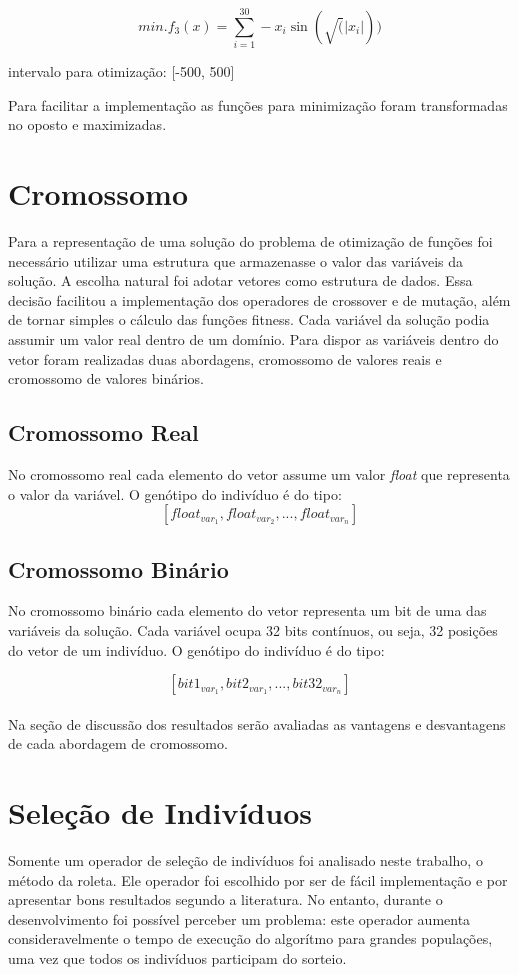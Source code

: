 \documentclass[conference]{IEEEtran}
\begin{document}
\[min. f_3(x) = \sum_{i=1}^{30} -x_i \sin(\sqrt(\left|x_i\right|))\]
\begin{center}intervalo para otimização: [-500, 500]\\\end{center}

Para facilitar a implementação as funções para minimização foram transformadas 
no oposto e maximizadas.

\section{Cromossomo}
Para a representação de uma solução do problema de otimização de funções foi
necessário utilizar uma estrutura que armazenasse o valor das variáveis da
solução. A escolha natural foi adotar vetores como estrutura de dados. Essa
decisão facilitou a implementação dos operadores de crossover e de mutação, além
de tornar simples o cálculo das funções fitness.
Cada variável da solução podia assumir um valor real dentro de um domínio. Para
dispor as variáveis dentro do vetor foram realizadas duas abordagens, cromossomo
de valores reais e cromossomo de valores binários.\\

\subsection{Cromossomo Real}
No cromossomo real cada elemento do vetor assume um valor \textit{float} que
representa o valor da variável. O genótipo do indivíduo é do tipo:
\[[float_{var_1}, float_{var_2}, ..., float_{var_n}]\]

\subsection{Cromossomo Binário}
No cromossomo binário cada elemento do vetor representa um bit de uma das 
variáveis da solução. Cada variável ocupa 32 bits contínuos, ou seja, 32 
posições do vetor de um indivíduo. O genótipo do indivíduo é do tipo:

\[[bit1_{var_1}, bit2_{var_1}, ..., bit32_{var_n}]\]\\

Na seção de discussão dos resultados serão avaliadas as vantagens e desvantagens
de cada abordagem de cromossomo.

\section{Seleção de Indivíduos}
Somente um operador de seleção de indivíduos foi analisado neste trabalho, o
método da roleta. Ele operador foi escolhido por ser de fácil implementação e
por apresentar bons resultados segundo a literatura. No entanto, durante o
desenvolvimento foi possível perceber um problema: este operador aumenta
consideravelmente o tempo de execução do algorítmo para grandes populações, uma 
vez que todos os indivíduos participam do sorteio.
\end{document}

